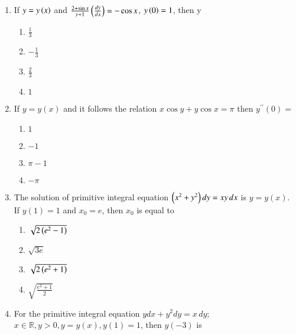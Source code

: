 \documentclass[journal,12pt,twocolumn]{IEEEtran}
\theoremstyle{remark}
\begin{document}
\begin{enumerate}
\item If $y = y\left(x\right)$ and $\frac{2 + \sin x}{y + 1}\left(\frac{dy}{dx}\right) = -\cos x$, $y\left(0\right) = 1$, then y \hfill {}

\begin{multicols}{2}
\begin{enumerate}
    \item $\frac{1}{3}$
    \item $-\frac{1}{3}$
    \item $\frac{2}{3}$
    \item $1$
\end{enumerate}
\end{multicols}

\item If $y = y(x)$ and it follows the relation $x \cos y + y \cos x = \pi$ then $y^{\prime\prime}(0) =$ \hfill {}

\begin{multicols}{2}
\begin{enumerate}
    \item $1$
    \item $-1$
    \item $\pi - 1$
    \item $-\pi$
\end{enumerate}  
\end{multicols}

\item The solution of primitive integral equation $\left(x^2 + y^2\right)dy = xy \, dx$ is $y = y(x)$. If $y(1) = 1$ and $x_0 = e$, then $x_0$ is equal to \hfill {}

\begin{multicols}{2}
\begin{enumerate}
    \item $\sqrt{2\left(e^2 - 1\right)}$
    \item $\sqrt{3e}$ 
    \item $\sqrt{2\left(e^2 + 1\right)}$
    \item $\sqrt{\frac{e^2 + 1}{2}}$
\end{enumerate}
\end{multicols}

\item For the primitive integral equation $y dx + y^2 dy = x \, dy$; $x \in \mathbb{R}, y > 0, y = y(x), y(1) = 1$, then $y(-3)$ is \hfill {}


\end{enumerate}
\end{document}
